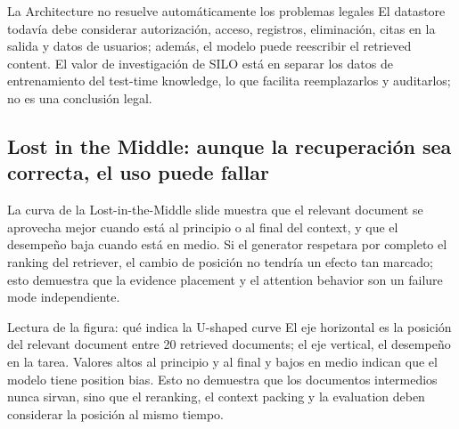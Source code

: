 
\begin{warningbox}{La Architecture no resuelve automáticamente los problemas legales}
El datastore todavía debe considerar autorización, acceso, registros, eliminación, citas en la salida y datos de usuarios; además, el modelo puede reescribir el retrieved content. El valor de investigación de SILO está en separar los datos de entrenamiento del test-time knowledge, lo que facilita reemplazarlos y auditarlos; no es una conclusión legal.
\end{warningbox}


\subsection{Lost in the Middle: aunque la recuperación sea correcta, el uso puede fallar}

La curva de la Lost-in-the-Middle slide muestra que el relevant document se aprovecha mejor cuando está al principio o al final del context, y que el desempeño baja cuando está en medio. Si el generator respetara por completo el ranking del retriever, el cambio de posición no tendría un efecto tan marcado; esto demuestra que la evidence placement y el attention behavior son un failure mode independiente.


\begin{knowledgebox}{Lectura de la figura: qué indica la U-shaped curve}
El eje horizontal es la posición del relevant document entre 20 retrieved documents; el eje vertical, el desempeño en la tarea. Valores altos al principio y al final y bajos en medio indican que el modelo tiene position bias. Esto no demuestra que los documentos intermedios nunca sirvan, sino que el reranking, el context packing y la evaluation deben considerar la posición al mismo tiempo.
\end{knowledgebox}

